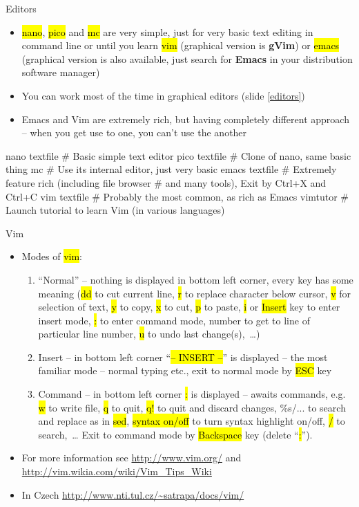 \documentclass[compress, ucs, xelatex, 11pt, xcolor=svgnames,
  hyperref={
    bookmarks=true,
    unicode=true,
    colorlinks=true,
    pdftitle={Linux, command line and MetaCentrum},
    plainpages=false,
    pdfauthor={Vojtech Zeisek},
    pdfsubject={Course about use of Linux command line, writing shell scripts and using MetaCentrum of CESNET},
    pdfcreator={XeLaTeX},
    pdfkeywords={Linux, GNU, BASH, shell, command line, MetaCentrum},
    linkcolor=DarkRed,
    anchorcolor=DarkBlue,
    citecolor=Indigo,
    filecolor=NavyBlue,
    menucolor=DarkMagenta,
    urlcolor=DarkBlue,
    pdftex},
  url={hyphens, lowtilde} %
  ]{beamer}
\renewcommand{\texttt}[1]{\hl{\ttfamily #1}}
\begin{document}
\begin{frame}[fragile]{Editors}
\begin{itemize}
 \item \texttt{nano}, \texttt{pico} and \texttt{mc} are very simple, just for very basic text editing in command line or until you learn \texttt{vim} (graphical version is \textbf{gVim}) or \texttt{emacs} (graphical version is also available, just search for \textbf{Emacs} in your distribution software manager)
 \item You can work most of the time in graphical editors (slide \ref{editors})
 \item Emacs and Vim are extremely rich, but having completely different approach -- when you get use to one, you can't use the another
\end{itemize}
  \begin{bashcode}
    nano textfile # Basic simple text editor
    pico textfile # Clone of nano, same basic thing
    mc # Use its internal editor, just very basic
    emacs textfile # Extremely feature rich (including file browser
                   # and many tools), Exit by Ctrl+X and Ctrl+C
    vim textfile # Probably the most common, as rich as Emacs
    vimtutor # Launch tutorial to learn Vim (in various languages)
   \end{bashcode}
\end{frame}

\begin{frame}{Vim}
\begin{itemize}
 \item Modes of \texttt{vim}:
  \begin{enumerate}
   \item ``Normal'' -- nothing is displayed in bottom left corner, every key has some meaning (\texttt{dd} to cut current line, \texttt{r} to replace character below cursor, \texttt{v} for selection of text, \texttt{y} to copy, \texttt{x} to cut, \texttt{p} to paste, \texttt{i} or \texttt{Insert} key to enter insert mode, \texttt{:} to enter command mode, number to get to line of particular line number, \texttt{u} to undo last change(s),~\ldots)
   \item Insert -- in bottom left corner ``\texttt{-- INSERT --}'' is displayed -- the most familiar mode -- normal typing etc., exit to normal mode by \texttt{ESC} key
   \item Command -- in bottom left corner \texttt{:} is displayed -- awaits commands, e.g. \texttt{w} to write file, \texttt{q} to quit, \texttt{q!} to quit and discard changes, \%s/... to search and replace as in \texttt{sed}, \texttt{syntax on/off} to turn syntax highlight on/off, \texttt{/} to search,~\ldots{ }Exit to command mode by \texttt{Backspace} key (delete ``\texttt{:}'').
  \end{enumerate}
  \item For more information see \url{http://www.vim.org/} and \url{http://vim.wikia.com/wiki/Vim_Tips_Wiki}
  \item In Czech \url{http://www.nti.tul.cz/~satrapa/docs/vim/}
\end{itemize}
\end{frame}
\end{document}
